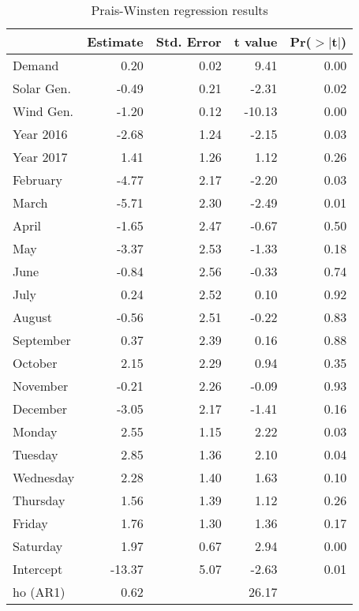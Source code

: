 \begin{table}[ht]
\centering
\begin{tabular}{lrrrr}
  \hline
 & Estimate & Std. Error & t value & Pr($>$$|$t$|$) \\ 
  \hline
Demand & 0.20 & 0.02 & 9.41 & 0.00 \\ 
  Solar Gen. & -0.49 & 0.21 & -2.31 & 0.02 \\ 
  Wind Gen. & -1.20 & 0.12 & -10.13 & 0.00 \\ 
  Year 2016 & -2.68 & 1.24 & -2.15 & 0.03 \\ 
  Year 2017 & 1.41 & 1.26 & 1.12 & 0.26 \\ 
  February & -4.77 & 2.17 & -2.20 & 0.03 \\ 
  March & -5.71 & 2.30 & -2.49 & 0.01 \\ 
  April & -1.65 & 2.47 & -0.67 & 0.50 \\ 
  May & -3.37 & 2.53 & -1.33 & 0.18 \\ 
  June & -0.84 & 2.56 & -0.33 & 0.74 \\ 
  July & 0.24 & 2.52 & 0.10 & 0.92 \\ 
  August & -0.56 & 2.51 & -0.22 & 0.83 \\ 
  September & 0.37 & 2.39 & 0.16 & 0.88 \\ 
  October & 2.15 & 2.29 & 0.94 & 0.35 \\ 
  November & -0.21 & 2.26 & -0.09 & 0.93 \\ 
  December & -3.05 & 2.17 & -1.41 & 0.16 \\ 
  Monday & 2.55 & 1.15 & 2.22 & 0.03 \\ 
  Tuesday & 2.85 & 1.36 & 2.10 & 0.04 \\ 
  Wednesday & 2.28 & 1.40 & 1.63 & 0.10 \\ 
  Thursday & 1.56 & 1.39 & 1.12 & 0.26 \\ 
  Friday & 1.76 & 1.30 & 1.36 & 0.17 \\ 
  Saturday & 1.97 & 0.67 & 2.94 & 0.00 \\ 
  Intercept & -13.37 & 5.07 & -2.63 & 0.01 \\ 
  
ho  (AR1) & 0.62 &  & 26.17 &  \\ 
   \hline
\end{tabular}
\caption{Prais-Winsten regression results} 
\end{table}
